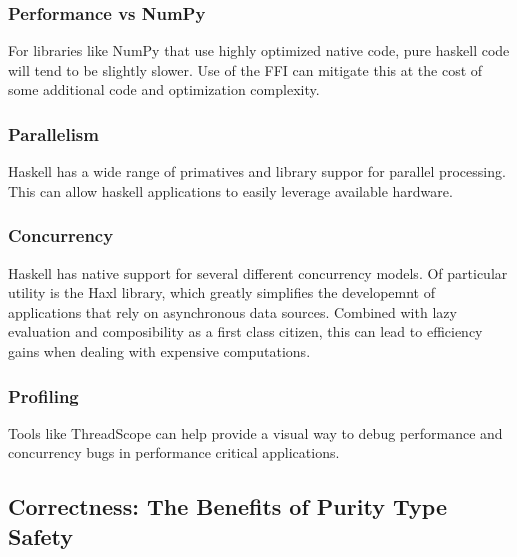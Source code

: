 \documentclass{beamer}
\begin{document}
\begin{frame}
  \frametitle{Performance vs NumPy}
  For libraries like NumPy that use highly optimized native code, pure
  haskell code will tend to be slightly slower.  Use of the FFI can
  mitigate this at the cost of some additional code and optimization
  complexity.
\end{frame}

\begin{frame}
  \frametitle{Parallelism}
  Haskell has a wide range of primatives and library suppor for
  parallel processing.  This can allow haskell applications to easily
  leverage available hardware.
\end{frame}

\begin{frame}
  \frametitle{Concurrency}
  Haskell has native support for several different concurrency models.
  Of particular utility is the Haxl library, which greatly simplifies
  the developemnt of applications that rely on asynchronous data
  sources.  Combined with lazy evaluation and composibility as a first
  class citizen, this can lead to efficiency gains when dealing with
  expensive computations.
\end{frame}

\begin{frame}
  \frametitle{Profiling}
  Tools like ThreadScope can help provide a visual way to debug
  performance and concurrency bugs in performance critical
  applications.
\end{frame}

\subsection{Correctness: The Benefits of Purity Type Safety}
\end{document}
